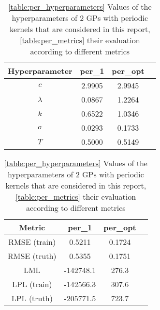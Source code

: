 \begin{table}[b]
    \centering
    \begin{subtable}[t]{0.45\textwidth}
        \centering
        \begin{tabular}[t]{|c|c|c|c|}
            \hline
            Hyperparameter & per\_1 & per\_opt \\
            \hline
            $c$ & 2.9905 & 2.9945 \\
            $\lambda$ & 0.0867 & 1.2264 \\
            $k$ & 0.6522 & 1.0346 \\
            $\sigma$ & 0.0293 & 0.1733 \\
            $T$ & 0.5000 & 0.5149 \\
            \hline
        \end{tabular}
        \caption{}
        \label{table:per_hyperparameters}
    \end{subtable}
    \begin{subtable}[t]{0.45\textwidth}
        \centering
        \begin{tabular}[t]{|c|c|c|c|}
            \hline
            Metric & per\_1 & per\_opt \\
            \hline
            RMSE (train) & 0.5211 & 0.1724 \\
            RMSE (truth) & 0.5355 & 0.1751 \\
            LML & -142748.1 & 276.3 \\
            LPL (train) & -142566.3 & 307.6 \\
            LPL (truth) & -205771.5 & 723.7 \\
            \hline
        \end{tabular}
        \caption{}
        \label{table:per_metrics}
    \end{subtable}
    \caption{\ref{table:per_hyperparameters} Values of the hyperparameters of 2 GPs with periodic kernels that are considered in this report, \ref{table:per_metrics} their evaluation according to different metrics}
    \label{table:per}
\end{table}
